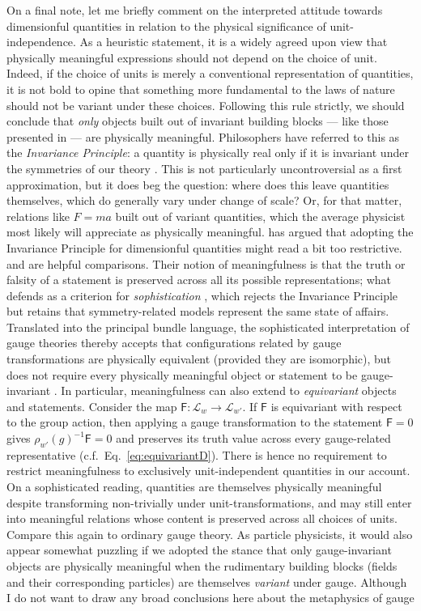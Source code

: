 \documentclass[12pt]{article}
\numberwithin{equation}{section}
\begin{document}
On a final note, let me briefly comment on the interpreted attitude towards dimensionful quantities in relation to the physical significance of unit-independence. As a heuristic statement, it is a widely agreed upon view that physically meaningful expressions should not depend on the choice of unit. Indeed, if the choice of units is merely a conventional representation of quantities, it is not bold to opine that something more fundamental to the laws of nature should not be variant under these choices. Following this rule strictly, we should conclude that \emph{only} objects built out of invariant building blocks --- like those presented in  --- are physically meaningful. Philosophers have referred to this as the \emph{Invariance Principle}: a quantity is physically real only if it is invariant under the symmetries of our theory \citep{MollerNielsen2017,Jacobs2021}. This is not particularly uncontroversial as a first approximation, but it does beg the question: where does this leave quantities themselves, which do generally vary under change of scale? Or, for that matter, relations like $F=ma$ built out of variant quantities, which the average physicist most likely will appreciate as physically meaningful. \citet{Jacobs2021} has argued that adopting the Invariance Principle for dimensionful quantities might read a bit too restrictive. \citet{Luce1978} and \citet{NarensLuce1987} are helpful comparisons. Their notion of meaningfulness is that the truth or falsity of a statement is preserved across all its possible representations; what \citeauthor{Jacobs2021} defends as a criterion for \emph{sophistication} \citep{Dewar2019}, which rejects the Invariance Principle but retains that symmetry-related models represent the same state of affairs. Translated into the principal bundle language, the sophisticated interpretation of gauge theories thereby accepts that configurations related by gauge transformations are physically equivalent (provided they are isomorphic), but does not require every physically meaningful object or statement to be gauge-invariant \citep{Jacobs2023,Gomes2026}. In particular, meaningfulness can also extend to \emph{equivariant} objects and statements. Consider the map $\mathsf{F}\colon \mathcal{L}_w\to \mathcal{L}_{w'}$. If $\mathsf{F}$ is equivariant with respect to the group action, then applying a gauge transformation to the statement $\mathsf{F}=0$ gives $\rho_{w'}(g)^{-1}\mathsf{F}=0$ and preserves its truth value across every gauge-related representative (c.f.~Eq.~\eqref{eq:equivariantD}). There is hence no requirement to restrict meaningfulness to exclusively unit-independent quantities in our account. On a sophisticated reading, quantities are themselves physically meaningful despite transforming non-trivially under unit-transformations, and may still enter into meaningful relations whose content is preserved across all choices of units. Compare this again to ordinary gauge theory. As particle physicists, it would also appear somewhat puzzling if we adopted the stance that only gauge-invariant objects are physically meaningful when the rudimentary building blocks (fields and their corresponding particles) are themselves \emph{variant} under gauge. Although I do not want to draw any broad conclusions here about the metaphysics of gauge 
\end{document}
